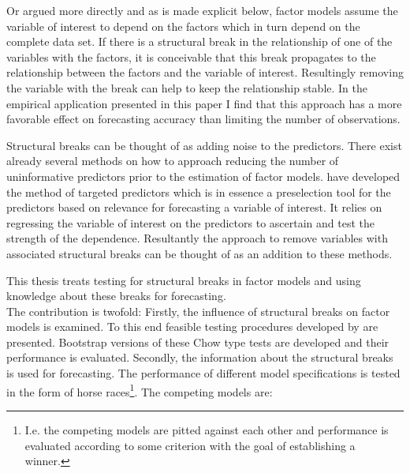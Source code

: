 \documentclass[12pt]{article}
\begin{document}
Or argued more directly and as is made explicit below, factor models assume the variable of interest to depend on the factors which in turn depend on the complete data set. If there is a structural break in the relationship of one of the variables with the factors, it is conceivable that this break propagates to the relationship between the factors and the variable of interest. Resultingly removing the variable with the break can help to keep the relationship stable. In the empirical application presented in this paper I find that this approach has a more favorable effect on forecasting accuracy than limiting the number of observations.

Structural breaks can be thought of as adding noise to the predictors. There exist already several methods on how to approach reducing the number of uninformative predictors prior to the estimation of factor models. \citet{bai2008forecasting} have developed the method of targeted predictors which is in essence a preselection tool for the predictors based on relevance for forecasting a variable of interest. It relies on regressing the variable of interest on the predictors to ascertain and test the strength of the dependence. Resultantly the approach to remove variables with associated structural breaks can be thought of as an addition to these methods.

This thesis treats testing for structural breaks in factor models and using knowledge about these breaks for forecasting. \\
The contribution is twofold: Firstly, the influence of structural breaks on factor models is examined. To this end feasible testing procedures developed by \citet{breitung2011testing} are presented. Bootstrap versions of these Chow type tests are developed and their performance is evaluated. Secondly, the information about the structural breaks is used for forecasting. The performance of different model specifications is tested in the form of horse races\footnote{I.e. the competing models are pitted against each other and performance is evaluated according to some criterion with the goal of establishing a winner.}. The competing models are:
\end{document}
